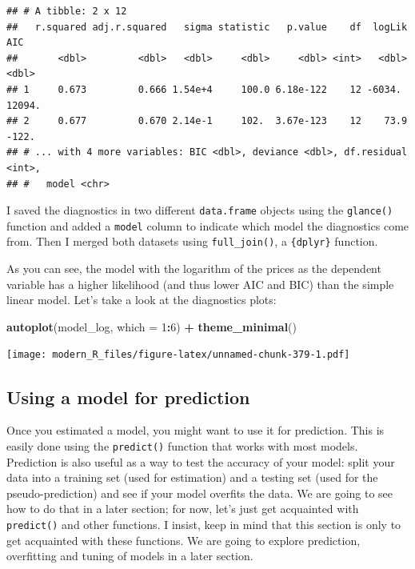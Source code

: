 \documentclass[]{gitbook}
\newenvironment{Shaded}{\begin{snugshade}}{\end{snugshade}}
\newcommand{\DataTypeTok}[1]{\textcolor[rgb]{0.13,0.29,0.53}{#1}}
\newcommand{\DecValTok}[1]{\textcolor[rgb]{0.00,0.00,0.81}{#1}}
\newcommand{\KeywordTok}[1]{\textcolor[rgb]{0.13,0.29,0.53}{\textbf{#1}}}
\newcommand{\NormalTok}[1]{#1}
\newcommand{\OperatorTok}[1]{\textcolor[rgb]{0.81,0.36,0.00}{\textbf{#1}}}
\newcommand{\StringTok}[1]{\textcolor[rgb]{0.31,0.60,0.02}{#1}}
\theoremstyle{definition}
\theoremstyle{definition}
\theoremstyle{definition}
\theoremstyle{remark}
\begin{document}
\begin{verbatim}
## # A tibble: 2 x 12
##   r.squared adj.r.squared   sigma statistic   p.value    df  logLik     AIC
##       <dbl>         <dbl>   <dbl>     <dbl>     <dbl> <int>   <dbl>   <dbl>
## 1     0.673         0.666 1.54e+4     100.0 6.18e-122    12 -6034.   12094.
## 2     0.677         0.670 2.14e-1     102.  3.67e-123    12    73.9   -122.
## # ... with 4 more variables: BIC <dbl>, deviance <dbl>, df.residual <int>,
## #   model <chr>
\end{verbatim}

I saved the diagnostics in two different \texttt{data.frame} objects
using the \texttt{glance()} function and added a \texttt{model} column
to indicate which model the diagnostics come from. Then I merged both
datasets using \texttt{full\_join()}, a \texttt{\{dplyr\}} function.

As you can see, the model with the logarithm of the prices as the
dependent variable has a higher likelihood (and thus lower AIC and BIC)
than the simple linear model. Let's take a look at the diagnostics
plots:

\begin{Shaded}
\begin{Highlighting}[]
\KeywordTok{autoplot}\NormalTok{(model_log, }\DataTypeTok{which =} \DecValTok{1}\OperatorTok{:}\DecValTok{6}\NormalTok{) }\OperatorTok{+}\StringTok{ }\KeywordTok{theme_minimal}\NormalTok{()}
\end{Highlighting}
\end{Shaded}

\texttt{[image: modern\_R\_files/figure-latex/unnamed-chunk-379-1.pdf]}

\hypertarget{using-a-model-for-prediction}{%
\subsection{Using a model for
prediction}\label{using-a-model-for-prediction}}

Once you estimated a model, you might want to use it for prediction.
This is easily done using the \texttt{predict()} function that works
with most models. Prediction is also useful as a way to test the
accuracy of your model: split your data into a training set (used for
estimation) and a testing set (used for the pseudo-prediction) and see
if your model overfits the data. We are going to see how to do that in a
later section; for now, let's just get acquainted with
\texttt{predict()} and other functions. I insist, keep in mind that this
section is only to get acquainted with these functions. We are going to
explore prediction, overfitting and tuning of models in a later section.
\end{document}
